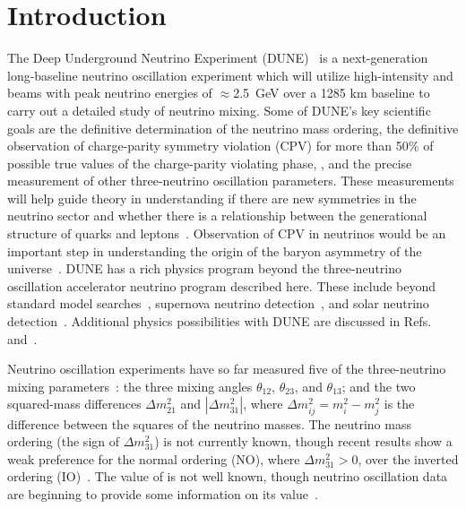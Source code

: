 \section{Introduction}
\label{sec:intro}

The Deep Underground Neutrino Experiment (DUNE)~\cite{Abi:2020wmh} is a next-generation long-baseline neutrino oscillation experiment which will utilize high-intensity \numu and \anumu beams with peak neutrino energies of $\approx$2.5~GeV over a 1285 km baseline to carry out a detailed study of neutrino mixing. Some of DUNE's key scientific goals are the definitive determination of the neutrino mass ordering, the definitive observation of charge-parity symmetry violation (CPV) for more than 50\% of possible true values of the charge-parity violating phase, \deltacp, and the precise measurement of other three-neutrino oscillation parameters.
These measurements will help guide theory in understanding if there are new symmetries in the neutrino sector and whether there is a relationship between the generational structure of quarks and leptons~\cite{Qian:2015waa}. Observation of CPV in neutrinos would be an important step in understanding the origin of the baryon asymmetry of the universe~\cite{Fukugita:1986hr, Davidson:2008bu}. DUNE has a rich physics program beyond the three-neutrino oscillation accelerator neutrino program described here. These include beyond standard model searches~\cite{Abi:2020kei}, supernova neutrino detection~\cite{Abi:2020lpk}, and solar neutrino detection~\cite{Capozzi:2018dat}. Additional physics possibilities with DUNE are discussed in Refs.~\cite{Abi:2020evt} and~\cite{AbedAbud:2021hpb}.

Neutrino oscillation experiments have so far measured five of the three-neutrino mixing parameters~\cite{Capozzi:2017ipn,deSalas:2020pgw,Esteban:2020cvm}: the three mixing angles $\theta_{12}$, $\theta_{23}$, and $\theta_{13}$; and the two squared-mass differences $\Delta m^{2}_{21}$ and $|\Delta m^{2}_{31}|$, where $\Delta m^2_{ij} = m^2_{i} - m^{2}_{j}$ is the difference between the squares of the neutrino masses.
The neutrino mass ordering (the sign of $\Delta m^{2}_{31}$) is not currently known, though recent results show a weak preference for the normal ordering (NO), where $\Delta m^{2}_{31} > 0$, over the inverted ordering (IO)~\cite{Abe:2021gky,PhysRevD.97.072001,PhysRevLett.123.151803}.
The value of \deltacp is not well known, though neutrino oscillation data are beginning to provide some information on its value~\cite{Abe:2019vii,Abe:2021gky}.

